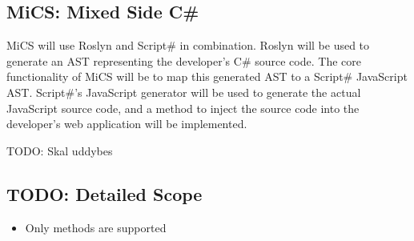 	\FloatBarrier

	\subsection{MiCS: Mixed Side C\#} %
	\label{sub:mics_mixed_side_csharp}
	MiCS will use Roslyn and Script\# in combination. Roslyn will be used to generate an AST representing the developer's C\# source code. The core functionality of MiCS will be to map this generated AST to a Script\# JavaScript AST. Script\#'s JavaScript generator will be used to generate the actual JavaScript source code, and a method to inject the source code into the developer's web application will be implemented.

	TODO: Skal uddybes

	\subsection{TODO: Detailed Scope} %
	\label{sub:detailed_scope}
	
		\begin{itemize}
			\item Only methods are supported
		\end{itemize}

